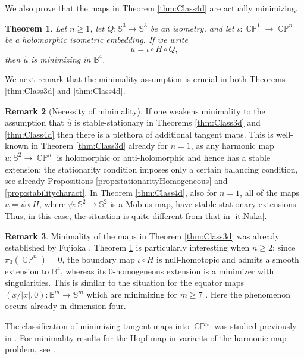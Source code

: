 \documentclass[11pt]{article}
\theoremstyle{plain}
\numberwithin{equation}{section}
\newtheorem{theorem}{Theorem}[section]
\theoremstyle{definition}
\newtheorem{remark}[theorem]{Remark}
\def \mb{\mathbb}
\DeclareMathOperator{\CP}{\mathbb{CP}}
\begin{document}
We also prove that the maps in Theorem \ref{thm:Class4d} are actually minimizing.
\begin{theorem}
    \label{thm:HopfMin}
    Let $n\geq1$, let $Q\colon\mb S^3\to\mb S^3$ be an isometry, and let $\iota\colon\CP^1\to\CP^n$ be a holomorphic isometric embedding. If we write
    \[
        u=\iota\circ H\circ Q,
    \]
    then $\hat u$ is minimizing in $\mb B^4$.
\end{theorem}

We next remark that the minimality assumption is crucial in both Theorems \ref{thm:Class3d} and \ref{thm:Class4d}.

\begin{remark}[Necessity of minimality]\label{rmk:minim}
If one weakens minimality to the assumption that $\hat u$ is stable-stationary in Theorems \ref{thm:Class3d} and \ref{thm:Class4d} then there is a plethora of additional tangent maps. This is well-known in Theorem \ref{thm:Class3d} already for $n=1$, as any harmonic map $u\colon \mb S^2\to \CP^n$ is holomorphic or anti-holomorphic and hence has a stable extension; the stationarity condition imposes only a certain balancing condition, see already Propositions \ref{prop:stationarityHomogeneous} and \ref{prop:stabilitycharact}. In Theorem \ref{thm:Class4d}, also for $n=1$, all of the maps $u=\psi \circ H$, where $\psi\colon \mb S^2\to \mb S^2$ is a M\"obius map, have stable-stationary extensions. Thus, in this case, the situation is quite different from that in \ref{it:Naka}.
\end{remark}

\begin{remark}
    \label{rmk:modelmin}
    Minimality of the maps in Theorem \ref{thm:Class3d} was already established by Fujioka \cite{Fujioka1993}. Theorem \ref{thm:HopfMin} is particularly interesting when $n\geq2$: since $\pi_3(\CP^n)=0$, the boundary map $\iota\circ H$ is null-homotopic and admits a smooth extension to $\mb B^4$, whereas its $0$-homogeneous extension is a minimizer with singularities. This is similar to the situation for the equator maps $(x/|x|,0)\colon\mb B^m\to\mb S^m$ which are minimizing for $m\geq7$ \cite{JagerKaul1983}. Here the phenomenon occurs already in dimension four.
\end{remark}

The classification of minimizing tangent maps into $\CP^n$ was studied previously in \cite{Fujioka1993}. For minimality results for the Hopf map in variants of the harmonic map problem, see \cite{GuerraLamyZemas2025,Riviere1998}.
\end{document}
